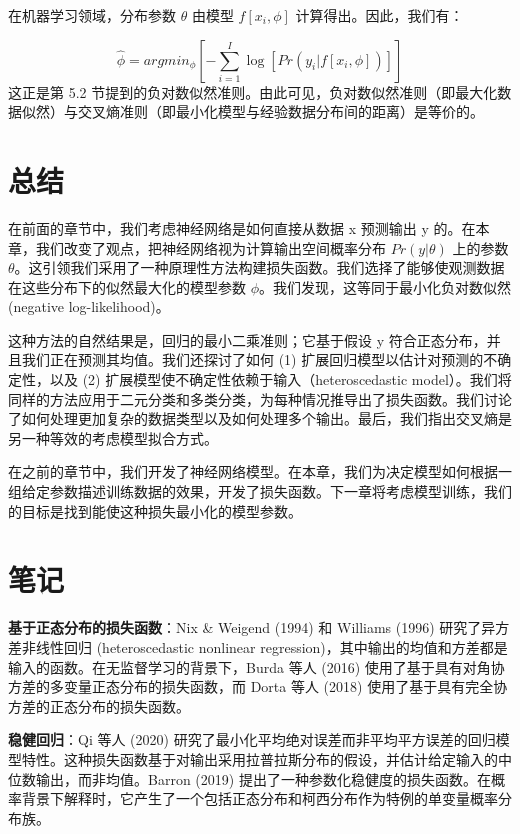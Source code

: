 在机器学习领域，分布参数 \(\theta\) 由模型 \(f[x_i, \phi]\) 计算得出。因此，我们有：

\begin{equation}
\hat{\phi} = argmin_{\phi} \left[ -\sum_{i=1}^{I} \log [Pr(y_i|f[x_i, \phi])] \right] 
\end{equation}
这正是第 5.2 节提到的负对数似然准则。由此可见，负对数似然准则（即最大化数据似然）与交叉熵准则（即最小化模型与经验数据分布间的距离）是等价的。

\section{总结}

在前面的章节中，我们考虑神经网络是如何直接从数据 x 预测输出 y 的。在本章，我们改变了观点，把神经网络视为计算输出空间概率分布 \(Pr(y|\theta)\) 上的参数 \(\theta\)。这引领我们采用了一种原理性方法构建损失函数。我们选择了能够使观测数据在这些分布下的似然最大化的模型参数 \(\phi\)。我们发现，这等同于最小化负对数似然 (negative log-likelihood)。

这种方法的自然结果是，回归的最小二乘准则；它基于假设 y 符合正态分布，并且我们正在预测其均值。我们还探讨了如何 (1) 扩展回归模型以估计对预测的不确定性，以及 (2) 扩展模型使不确定性依赖于输入（heteroscedastic model）。我们将同样的方法应用于二元分类和多类分类，为每种情况推导出了损失函数。我们讨论了如何处理更加复杂的数据类型以及如何处理多个输出。最后，我们指出交叉熵是另一种等效的考虑模型拟合方式。

在之前的章节中，我们开发了神经网络模型。在本章，我们为决定模型如何根据一组给定参数描述训练数据的效果，开发了损失函数。下一章将考虑模型训练，我们的目标是找到能使这种损失最小化的模型参数。


\section{笔记}

\textbf{基于正态分布的损失函数}：Nix \& Weigend (1994) 和 Williams (1996) 研究了异方差非线性回归 (heteroscedastic nonlinear regression)，其中输出的均值和方差都是输入的函数。在无监督学习的背景下，Burda 等人 (2016) 使用了基于具有对角协方差的多变量正态分布的损失函数，而 Dorta 等人 (2018) 使用了基于具有完全协方差的正态分布的损失函数。

\textbf{稳健回归}：Qi 等人 (2020) 研究了最小化平均绝对误差而非平均平方误差的回归模型特性。这种损失函数基于对输出采用拉普拉斯分布的假设，并估计给定输入的中位数输出，而非均值。Barron (2019) 提出了一种参数化稳健度的损失函数。在概率背景下解释时，它产生了一个包括正态分布和柯西分布作为特例的单变量概率分布族。

